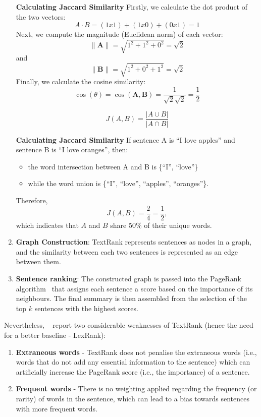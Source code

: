 \begin{enumerate}
\begin{beaux_exemples}{\textbf{Calculating Jaccard Similarity}}
            Firstly, we calculate the dot product of the two vectors:
            \[
                A \cdot B = (1x1) + (1x0) + (0x1) = 1
            \]
            Next, we compute the magnitude (Euclidean norm) of each vector:
            \[
                \|\mathbf{A}\| = \sqrt{1^2 + 1^2 + 0^2} = \sqrt{2}
            \]
            and
            \[
                \|\mathbf{B}\| = \sqrt{1^2 + 0^2 + 1^2} = \sqrt{2}
            \]
            Finally, we calculate the cosine similarity:
            \[
                \cos(\theta) = \cos(\mathbf{A},\mathbf{B}) = \frac{1}{\sqrt{2} \sqrt{2}} = \frac{1}{2}
            \]
        \end{beaux_exemples}
        \begin{equation}\label{eq:jaccard_similarity}
            J(A,B)= \frac{|A\cup B|}{|A\cap B|}
        \end{equation}
        \begin{beaux_exemples}{\textbf{Calculating Jaccard Similarity}}\label{ex:jaccard}
            If sentence A is ``I love apples'' and sentence B is ``I love oranges'', then:
            \begin{itemize}
                \item the word intersection between A and B is \{``I'', ``love''\}
                \item while the word union is \{``I'', ``love'', ``apples'', ``oranges''\}.
            \end{itemize}
            Therefore,
            \[
                J(A,B)=\frac{2}{4}=\frac{1}{2},
            \]
            which indicates that $A$ and $B$ share 50\% of their unique words.
        \end{beaux_exemples}
    \item \textbf{Graph Construction}: TextRank represents sentences as nodes in a graph, and the similarity between each two sentences is represented as an edge between them.
    \item \textbf{Sentence ranking}: The constructed graph is passed into the PageRank algorithm~\cite{page1998anatomy} that assigns each sentence a score based on the importance of its neighbours.
    The final summary is then assembled from the selection of the top $k$ sentences with the highest scores.
\end{enumerate}
Nevertheless, ~\cite{Shearing2020AutomatedTS} report two considerable weaknesses of TextRank (hence the need for a better baseline - LexRank):
\begin{enumerate}
    \item \textbf{Extraneous words} - TextRank does not penalise the extraneous words (i.e., words that do not add any essential information to the sentence) which can artificially increase the PageRank score (i.e., the importance) of a sentence.
    \item \textbf{Frequent words} - There is no weighting applied regarding the frequency (or rarity) of words in the sentence, which can lead to a bias towards sentences with more frequent words.
\end{enumerate}
